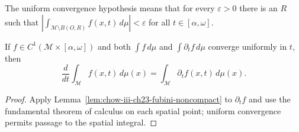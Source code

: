 \begin{remark}
\label{rem:chow-iii-ch23-fubini-tail}
The uniform convergence hypothesis means that for every $\varepsilon>0$ there
is an $R$ such that
\(\left|\int_{\mathcal M\setminus B(O,R)}f(x,t)\,d\mu\right|<\varepsilon\)
for all $t\in[\alpha,\omega]$.
\end{remark}

\begin{lemma}
\label{lem:chow-iii-ch23-differentiation-under-integral}
If $f\in C^1(\mathcal M\times[\alpha,\omega])$ and both
\(\int f\,d\mu\) and $\int\partial_tf\,d\mu$ converge uniformly in $t$, then
\[
\frac d{dt}\int_{\mathcal M}f(x,t)\,d\mu(x)
=\int_{\mathcal M}\partial_tf(x,t)\,d\mu(x).
\]
\end{lemma}
\begin{proof}
Apply Lemma~\ref{lem:chow-iii-ch23-fubini-noncompact} to $\partial_tf$ and use
the fundamental theorem of calculus on each spatial point; uniform convergence
permits passage to the spatial integral.
\end{proof}
